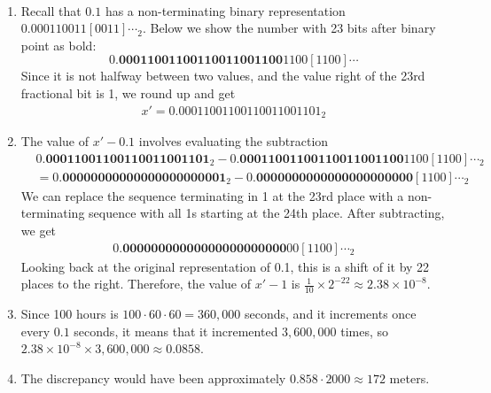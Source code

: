 \documentclass[12pt]{article}
\newenvironment{sol}[1][Solution]{\begin{trivlist}
		\item[\hskip \labelsep {\bfseries #1:}]}{\end{trivlist}}
\begin{document}
\begin{sol}
	\
	\begin{enumerate}[label=(\alph*)]
		\item Recall that $0.1$ has a non-terminating binary representation
		$0.000110011[0011]\cdots_2$. Below we show the number with 23 bits
		after binary point as bold:
		\[
		0.\textbf{00011001100110011001100}1100[1100]\cdots
		\]
		Since it is not halfway between two values, and the value right of the 23rd
		fractional bit is 1, we round up and get
		\begin{align*}
			x'=0.00011001100110011001101_2
		\end{align*}
		\item The value of $x'-0.1$ involves evaluating the subtraction
		\begin{align*}
			&0.\textbf{00011001100110011001101}_2-0.\textbf{00011001100110011001100}1100[1100]\cdots_2\\
			&=0.\textbf{00000000000000000000001}_2-0.\textbf{0000000000000000000000}[1100]\cdots_2
		\end{align*}
		We can replace the sequence terminating in 1 at the 23rd place with a non-terminating
		sequence with all 1s starting at the 24th place. After subtracting, we get
		\begin{align*}
			0.\textbf{00000000000000000000000}00[1100]\cdots_2
		\end{align*}
		Looking back at the original representation of 0.1, this is a shift of it by 22 places
		to the right. Therefore, the value of $x'-1$ is
		$\frac{1}{10}\times 2^{-22}\approx 2.38\times 10^{-8}$.
		\item Since 100 hours is $100\cdot 60\cdot 60=360,000$ seconds, and it increments once
		every $0.1$ seconds, it means that it incremented $3,600,000$ times, so
		$2.38\times 10^{-8}\times 3,600,000\approx 0.0858$.
		\item The discrepancy would have been approximately $0.858\cdot 2000\approx 172$ meters.
	\end{enumerate}
\end{sol}
\end{document}
